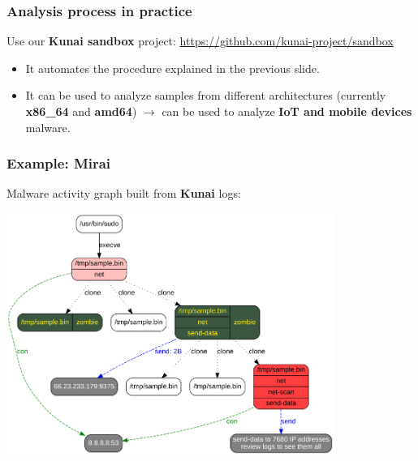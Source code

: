 \begin{frame}
	\frametitle{Analysis process in practice}

	Use our \textbf{Kunai sandbox} project: \url{https://github.com/kunai-project/sandbox}

	\vspace{1em}

	\begin{itemize}
		\item It automates the procedure explained in the previous slide.
		\item It can be used to analyze samples from different architectures (currently \textbf{x86\_64} and \textbf{amd64}) $\rightarrow$ can be used to analyze \textbf{IoT and mobile devices} malware.
	\end{itemize}
\end{frame}

\begin{frame}
	\frametitle{Example: Mirai}

	Malware activity graph built from \textbf{Kunai} logs:
	\begin{center}
		\includegraphics[width=0.8\textwidth]{img/kunai-sample.png}
	\end{center}
\end{frame}

